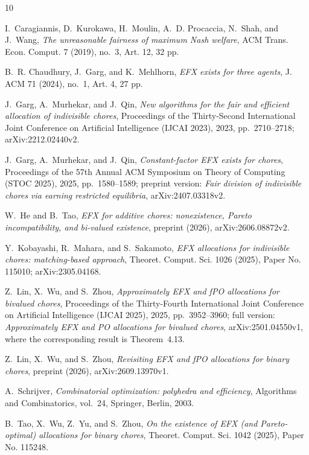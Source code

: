 \documentclass{amsart}
\numberwithin{equation}{section}
\theoremstyle{definition}
\theoremstyle{remark}
\begin{document}
\begin{thebibliography}{10}

I.~Caragiannis, D.~Kurokawa, H.~Moulin, A.~D. Procaccia, N.~Shah, and J.~Wang, \emph{The unreasonable fairness of maximum Nash welfare}, ACM Trans. Econ. Comput. 7 (2019), no.~3, Art. 12, 32 pp.

B.~R. Chaudhury, J.~Garg, and K.~Mehlhorn, \emph{EFX exists for three agents}, J. ACM 71 (2024), no.~1, Art. 4, 27 pp.

J.~Garg, A.~Murhekar, and J.~Qin, \emph{New algorithms for the fair and efficient allocation of indivisible chores}, Proceedings of the Thirty-Second International Joint Conference on Artificial Intelligence (IJCAI 2023), 2023, pp.~2710--2718; arXiv:2212.02440v2.

J.~Garg, A.~Murhekar, and J.~Qin, \emph{Constant-factor EFX exists for chores}, Proceedings of the 57th Annual ACM Symposium on Theory of Computing (STOC 2025), 2025, pp.~1580--1589; preprint version: \emph{Fair division of indivisible chores via earning restricted equilibria}, arXiv:2407.03318v2.

W.~He and B.~Tao, \emph{EFX for additive chores: nonexistence, Pareto incompatibility, and bi-valued existence}, preprint (2026), arXiv:2606.08872v2.

Y.~Kobayashi, R.~Mahara, and S.~Sakamoto, \emph{EFX allocations for indivisible chores: matching-based approach}, Theoret. Comput. Sci. 1026 (2025), Paper No. 115010; arXiv:2305.04168.

Z.~Lin, X.~Wu, and S.~Zhou, \emph{Approximately EFX and fPO allocations for bivalued chores}, Proceedings of the Thirty-Fourth International Joint Conference on Artificial Intelligence (IJCAI 2025), 2025, pp.~3952--3960; full version: \emph{Approximately EFX and PO allocations for bivalued chores}, arXiv:2501.04550v1, where the corresponding result is Theorem~4.13.

Z.~Lin, X.~Wu, and S.~Zhou, \emph{Revisiting EFX and fPO allocations for binary chores}, preprint (2026), arXiv:2609.13970v1.

A.~Schrijver, \emph{Combinatorial optimization: polyhedra and efficiency}, Algorithms and Combinatorics, vol.~24, Springer, Berlin, 2003.

B.~Tao, X.~Wu, Z.~Yu, and S.~Zhou, \emph{On the existence of EFX (and Pareto-optimal) allocations for binary chores}, Theoret. Comput. Sci. 1042 (2025), Paper No. 115248.

\end{thebibliography}
\end{document}
